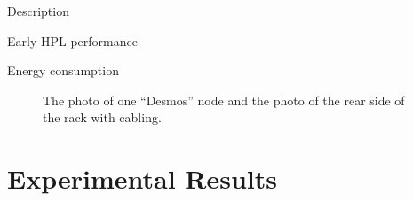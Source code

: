 \documentclass{llncs}
\begin{document}




Description

Early HPL performance

Energy consumption

\begin{figure}[h]
\centering
\caption{The photo of one ``Desmos'' node and the photo of the rear side of the rack with cabling.}
\end{figure}



\section{Experimental Results}
\end{document}

